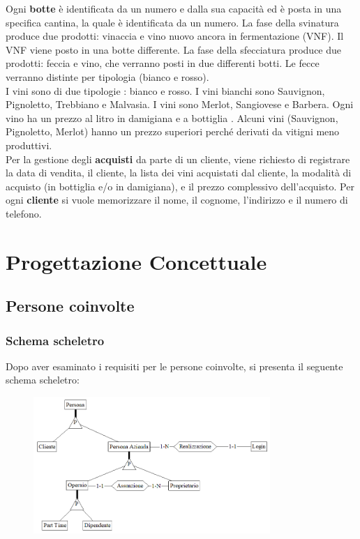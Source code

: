 \documentclass{article}
\begin{document}
{Ogni \textbf{botte} è identificata da un numero e dalla sua capacità ed è posta in una specifica cantina, la quale è identificata da un numero.
La fase della svinatura produce due prodotti: vinaccia e vino nuovo ancora in fermentazione (VNF). Il VNF viene posto in una botte differente. 
La fase della sfecciatura produce due prodotti: feccia e vino, che verranno posti in due differenti botti. Le fecce verranno distinte per tipologia (bianco e rosso).\\
I vini sono di due tipologie : bianco e rosso. I vini bianchi sono Sauvignon, Pignoletto, Trebbiano e Malvasia. I vini sono Merlot, Sangiovese e Barbera.
Ogni vino ha un prezzo al litro in damigiana e a bottiglia .
Alcuni vini (Sauvignon, Pignoletto, Merlot) hanno un prezzo superiori perché derivati da vitigni meno produttivi.\\\newline
Per la gestione degli \textbf{acquisti} da parte di un cliente, viene richiesto di registrare la data di vendita, il cliente, la lista dei vini acquistati dal cliente, la modalità di acquisto (in bottiglia e/o in damigiana), e il prezzo complessivo dell'acquisto. Per ogni \textbf{cliente} si vuole memorizzare il nome, il cognome, l'indirizzo e il numero di telefono.}\\
\newpage
\section{Progettazione Concettuale}
\subsection{Persone coinvolte}
\subsubsection{Schema scheletro}
Dopo aver esaminato i requisiti per le persone coinvolte, si presenta il seguente schema scheletro:
\begin{figure}[htbp]
\centering
\includegraphics[width=0.8\textwidth]{img/Persone_Scheletro.png}
\end{figure}
\end{document}

